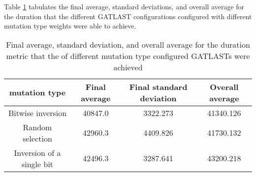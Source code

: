 Table \ref{tab:HP:GA:mutationType:duration} tabulates the final average, standard deviations, and overall average for the duration that the different GATLAST configurations configured with different mutation type weights were able to achieve.
\begin{table}[tbh!]
\centering
\begin{adjustbox}{trim=0cm 0cm 0cm 0cm, clip=true}
\begin{tabular}{|c|c|c|c|}
\hline
mutation type & Final average & Final standard deviation & Overall average\\
\hline
Bitwise inversion & 40847.0 & 3322.273 & 41340.126\\\hline
Random selection & 42960.3 & 4409.826 & 41730.132\\\hline
Inversion of a single bit & 42496.3 & 3287.641 & 43200.218\\\hline
\end{tabular}
\end{adjustbox}
\caption{Final average, standard deviation, and overall average for the duration metric that the of different mutation type configured GATLASTs were achieved}
\label{tab:HP:GA:mutationType:duration}
\end{table}